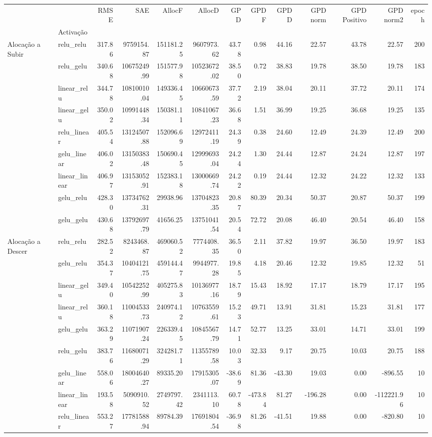 \begin{tabular}{llrrrrrrrrrrr}
\toprule
 &  & RMSE & SAE & AllocF & AllocD & GPD & GPD F & GPD D & GPD norm & GPD Positivo & GPD norm2 & epoch \\
 & Activação &  &  &  &  &  &  &  &  &  &  &  \\
\midrule
\multirow[t]{9}{*}{Alocação a Subir} & relu_relu & 317.86 & 9759154.87 & 151181.25 & 9607973.62 & 43.78 & 0.98 & 44.16 & 22.57 & 43.78 & 22.57 & 200 \\
 & relu_gelu & 340.68 & 10675249.99 & 151577.98 & 10523672.02 & 38.50 & 0.72 & 38.83 & 19.78 & 38.50 & 19.78 & 183 \\
 & linear_relu & 344.78 & 10810010.04 & 149336.45 & 10660673.59 & 37.72 & 2.19 & 38.04 & 20.11 & 37.72 & 20.11 & 174 \\
 & linear_gelu & 350.02 & 10991448.34 & 150381.11 & 10841067.23 & 36.68 & 1.51 & 36.99 & 19.25 & 36.68 & 19.25 & 135 \\
 & relu_linear & 405.54 & 13124507.88 & 152096.69 & 12972411.19 & 24.39 & 0.38 & 24.60 & 12.49 & 24.39 & 12.49 & 200 \\
 & gelu_linear & 406.02 & 13150383.48 & 150690.45 & 12999693.04 & 24.24 & 1.30 & 24.44 & 12.87 & 24.24 & 12.87 & 197 \\
 & linear_linear & 406.97 & 13153052.91 & 152383.18 & 13000669.74 & 24.22 & 0.19 & 24.44 & 12.32 & 24.22 & 12.32 & 133 \\
 & gelu_relu & 428.30 & 13734762.31 & 29938.96 & 13704823.35 & 20.87 & 80.39 & 20.34 & 50.37 & 20.87 & 50.37 & 199 \\
 & gelu_gelu & 430.68 & 13792697.79 & 41656.25 & 13751041.54 & 20.54 & 72.72 & 20.08 & 46.40 & 20.54 & 46.40 & 158 \\
\cline{1-13}
\multirow[t]{9}{*}{Alocação a Descer} & relu_relu & 282.52 & 8243468.87 & 469060.52 & 7774408.35 & 36.50 & 2.11 & 37.82 & 19.97 & 36.50 & 19.97 & 183 \\
 & gelu_relu & 354.37 & 10404121.75 & 459144.47 & 9944977.28 & 19.85 & 4.18 & 20.46 & 12.32 & 19.85 & 12.32 & 51 \\
 & linear_gelu & 349.40 & 10542252.99 & 405275.83 & 10136977.16 & 18.79 & 15.43 & 18.92 & 17.17 & 18.79 & 17.17 & 195 \\
 & linear_relu & 360.18 & 11004533.73 & 240974.12 & 10763559.61 & 15.23 & 49.71 & 13.91 & 31.81 & 15.23 & 31.81 & 177 \\
 & gelu_gelu & 363.29 & 11071907.24 & 226339.45 & 10845567.79 & 14.71 & 52.77 & 13.25 & 33.01 & 14.71 & 33.01 & 199 \\
 & relu_gelu & 383.76 & 11680071.29 & 324281.71 & 11355789.58 & 10.03 & 32.33 & 9.17 & 20.75 & 10.03 & 20.75 & 188 \\
 & gelu_linear & 558.06 & 18004640.27 & 89335.20 & 17915305.07 & -38.69 & 81.36 & -43.30 & 19.03 & 0.00 & -896.55 & 10 \\
 & linear_linear & 193.58 & 5090910.52 & 2749797.42 & 2341113.10 & 60.78 & -473.84 & 81.27 & -196.28 & 0.00 & -112221.96 & 10 \\
 & relu_linear & 553.27 & 17781588.94 & 89784.39 & 17691804.54 & -36.98 & 81.26 & -41.51 & 19.88 & 0.00 & -820.80 & 10 \\
\cline{1-13}
\bottomrule
\end{tabular}
